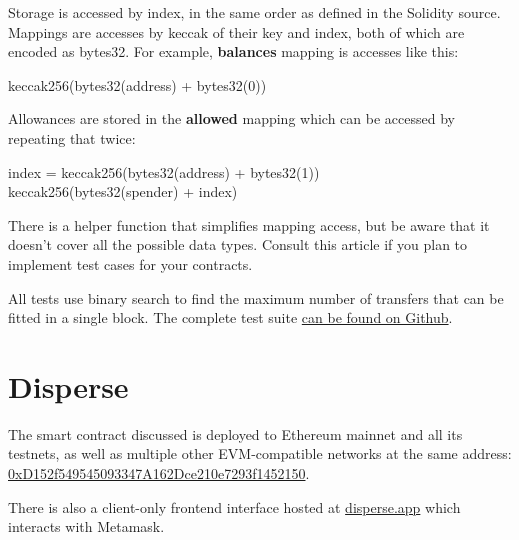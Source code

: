 \documentclass[12pt]{article}
\begin{document}
Storage is accessed by index, in the same order as defined in the Solidity source.
Mappings are accesses by keccak of their key and index, both of which are encoded as bytes32.
For example, \textbf{balances} mapping is accesses like this:
\begin{center}
	keccak256(bytes32(address) + bytes32(0))	
\end{center}

Allowances are stored in the \textbf{allowed} mapping which can be accessed by repeating that twice:
\begin{center}
index = keccak256(bytes32(address) + bytes32(1)) \\
keccak256(bytes32(spender) + index)	
\end{center}

There is a helper function that simplifies mapping access, but be aware that it doesn't cover all the possible data types.
Consult this article\cite{read-storage} if you plan to implement test cases for your contracts.

All tests use binary search to find the maximum number of transfers that can be fitted in a single block.
The complete test suite \href{https://github.com/banteg/disperse-reseach}{can be found on Github}.

\section{Disperse}

The smart contract discussed is deployed to Ethereum mainnet and all its testnets, as well as multiple other EVM-compatible networks at the same address: \href{https://etherscan.io/address/0xD152f549545093347A162Dce210e7293f1452150}{0xD152f549545093347A162Dce210e7293f1452150}.

There is also a client-only frontend interface hosted at \href{https://disperse.app/}{disperse.app} which interacts with Metamask.
\end{document}
